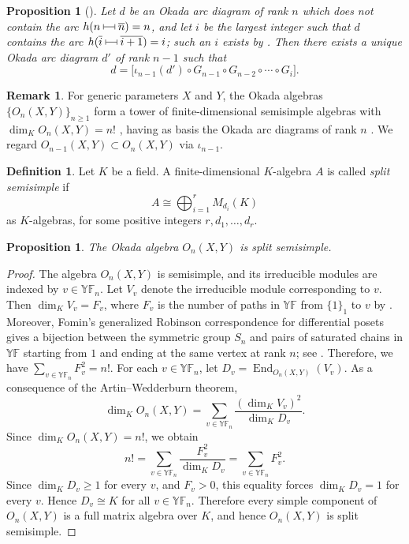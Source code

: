 \documentclass[12pt,reqno]{amsart}
\numberwithin{equation}{section}
\newtheorem{proposition}[theorem]{Proposition}
\theoremstyle{definition}
\newtheorem{definition}[theorem]{Definition}
\theoremstyle{definition}
\newtheorem{remark}[theorem]{Remark}
\newcommand{\YF}{\mathbb{YF}}
\newcommand{\arcjoin}{\mathrel{%
  \rule[0.1ex]{0.4pt}{1.1ex}%
  \rule[0.6ex]{1em}{0.4pt}%
  \rule[0.1ex]{0.4pt}{1.1ex}%
}}
\begin{document}
\begin{proposition}[{\cite[Propositions~3.56 and 3.57]{HivertScott}}]\label{J_n}
Let $d$ be an Okada arc diagram of rank $n$ which does not contain the arc
$h(n\arcjoin\overline n)=n$, and let $i$ be the largest integer such that $d$
contains the arc $h(\overline i\arcjoin\overline{i+1})=i$; such an $i$ exists by
\cite[Corollary 3.53]{HivertScott}. Then there exists a unique Okada arc
diagram $d'$ of rank $n-1$ such that
\[
d=\bigl[\iota_{n-1}(d')\circ G_{n-1}\circ G_{n-2}\circ\cdots\circ G_i\bigr].
\]
\end{proposition}


\begin{remark}
For generic parameters $X$ and $Y$, the Okada algebras $\{O_n(X,Y)\}_{n\ge1}$
form a tower of finite-dimensional semisimple algebras with
$\dim_K O_n(X,Y)=n!$ \cite[Theorem 2.6]{Okada}, having as basis the Okada arc
diagrams of rank $n$ \cite[Proposition 6.2]{HivertScott}. We regard
$O_{n-1}(X,Y)\subset O_n(X,Y)$ via $\iota_{n-1}$.
\end{remark}
\begin{definition}
Let $K$ be a field. A finite-dimensional $K$-algebra $A$ is called
\emph{split semisimple} if
\[
A\cong\bigoplus_{i=1}^r M_{d_i}(K)
\]
as $K$-algebras, for some positive integers $r,d_1,\ldots,d_r$.
\end{definition}
\begin{proposition}\label{split}
The Okada algebra $O_n(X,Y)$ is split semisimple.
\end{proposition}


\begin{proof}
The algebra $O_n(X,Y)$ is semisimple, and its
irreducible modules are indexed by $v\in \YF_n$. Let $V_v$ denote the
irreducible module corresponding to $v$. Then
$\dim_K V_v=F_v$, where $F_v$ is the number of paths in $\YF$ from $\{1\}_1$ to
$v$ by \cite[Theorem 2.6]{Okada}. Moreover, Fomin's generalized Robinson correspondence for differential posets gives a bijection between the symmetric group $S_n$ and pairs of saturated chains in $\YF$ starting from $1$ and ending at the same vertex at rank $n$; see \cite[Example 2.6.8]{Roby1991}. Therefore, we have
$\sum_{v\in\YF_n} F_v^2=n!.$
For each $v\in\YF_n$, let
$D_v=\operatorname{End}_{O_n(X,Y)}(V_v)$. As a consequence of the Artin--Wedderburn theorem,
\[
\dim_K O_n(X,Y)
 =\sum_{v\in\YF_n}
 \frac{(\dim_K V_v)^2}{\dim_K D_v}.
\]
Since $\dim_K O_n(X,Y)=n!$, we obtain
\[
n!
=\sum_{v\in\YF_n}\frac{F_v^2}{\dim_K D_v}
=\sum_{v\in\YF_n}F_v^2.
\]
Since $\dim_K D_v\geq 1$ for every $v$, and $F_v>0$, this equality forces
$\dim_K D_v=1$ for every $v$. Hence $D_v\cong K$ for all $v\in\YF_n$.
Therefore every simple component of $O_n(X,Y)$ is a full matrix algebra
over $K$, and hence $O_n(X,Y)$ is split semisimple.
\end{proof}
\end{document}
